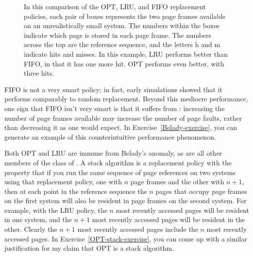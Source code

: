 \begin{figure}
{\begin{graph}
\end{graph}}
\fi
\caption{In this comparison of the OPT, LRU, and FIFO replacement
  policies, each pair of boxes represents the two page frames
  available on an unrealistically small system.  The numbers within
  the boxes indicate which page is stored in each page frame.  The
  numbers across the top are the reference sequence, and the letters h
  and m indicate hits and misses.  In this example, LRU performs
  better than FIFO, in that it has one more hit.  OPT performs even
  better, with three hits.}
\label{replacement-comparison}
\end{figure}

FIFO is not a very smart policy; in fact, early simulations showed
that it performs comparably to random replacement.  Beyond this
mediocre performance, one sign that FIFO isn't very smart is that it
suffers from : increasing the number of page
frames available may increase the number of page faults, rather than
decreasing it as one would expect.  In Exercise~\ref{Belady-exercise},
you can generate an example of this counterintuitive performance
phenomenon.

Both OPT and LRU are immune from Belady's anomaly, as are all other
members of the class of .  A stack algorithm is
a replacement policy with the property that if you run the same
sequence of page references on two systems using that replacement
policy, one with $n$ page frames and the other with $n+1$, then at each
point in the reference sequence the $n$ pages that occupy page frames
on the first system will also be resident in page frames on the second
system.  For example, with the LRU policy, the $n$ most recently
accessed pages will be resident in one system, and the $n+1$ most
recently accessed pages will be resident in the other. Clearly the $n+1$ most recently
accessed pages include the $n$ most recently accessed pages.  In
Exercise~\ref{OPT-stack-exercise}, you can come up with a similar
justification for my claim that OPT is a stack algorithm.

